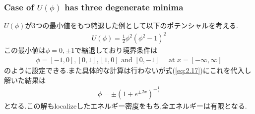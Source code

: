 \documentclass[dvipdfmx,11pt,a4paper,oneside,openany]{jsbook}
\begin{document}
\subsubsection{Case of $U(\phi)$ has three degenerate minima}
$U(\phi)$が3つの最小値をもつ縮退した例として以下のポテンシャルを考える.
\begin{align*}
    U(\phi)=\frac{1}{2} \phi^{2}\left(\phi^{2}-1\right)^{2}
\end{align*}
この最小値は$\phi=0,\pm1$で縮退しており境界条件は
\begin{align*}
    \phi=[-1,0],[0,1],[1,0] \text { and }[0,-1] \quad \text { at } x=[-\infty, \infty]
\end{align*}
のように設定できる.また具体的な計算は行わないが式(\ref{eq:2.17})にこれを代入し解いた結果は
\begin{align}
    \phi=\pm\left(1+e^{\pm 2 x}\right)^{-\frac{1}{2}}
\end{align}
となる.この解もlocalizeしたエネルギー密度をもち,全エネルギーは有限となる.
\end{document}
